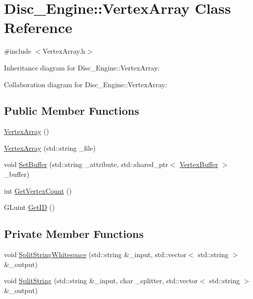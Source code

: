 \hypertarget{class_disc___engine_1_1_vertex_array}{}\section{Disc\+\_\+\+Engine\+:\+:Vertex\+Array Class Reference}
\label{class_disc___engine_1_1_vertex_array}


{\ttfamily \#include $<$Vertex\+Array.\+h$>$}



Inheritance diagram for Disc\+\_\+\+Engine\+:\+:Vertex\+Array\+:


Collaboration diagram for Disc\+\_\+\+Engine\+:\+:Vertex\+Array\+:
\subsection*{Public Member Functions}
\begin{DoxyCompactItemize}
\item 
\mbox{\hyperlink{class_disc___engine_1_1_vertex_array_ab8a2dcce9698f96dac5f9a19c6979d03}{Vertex\+Array}} ()
\item 
\mbox{\hyperlink{class_disc___engine_1_1_vertex_array_a5a2ba48c12787ad986bdf8dbb1a8675a}{Vertex\+Array}} (std\+::string \+\_\+file)
\item 
void \mbox{\hyperlink{class_disc___engine_1_1_vertex_array_a4e37246586ba4eca3a7734b050319a39}{Set\+Buffer}} (std\+::string \+\_\+attribute, std\+::shared\+\_\+ptr$<$ \mbox{\hyperlink{class_disc___engine_1_1_vertex_buffer}{Vertex\+Buffer}} $>$ \+\_\+buffer)
\item 
int \mbox{\hyperlink{class_disc___engine_1_1_vertex_array_a94f9ebffa24c5721783099fef186f9a0}{Get\+Vertex\+Count}} ()
\item 
G\+Luint \mbox{\hyperlink{class_disc___engine_1_1_vertex_array_ab5d3887c2b7ab5fa779cda481f776c98}{Get\+ID}} ()
\end{DoxyCompactItemize}
\subsection*{Private Member Functions}
\begin{DoxyCompactItemize}
\item 
void \mbox{\hyperlink{class_disc___engine_1_1_vertex_array_ada4ca194c3941ef272072f606b9f94a9}{Split\+String\+Whitespace}} (std\+::string \&\+\_\+input, std\+::vector$<$ std\+::string $>$ \&\+\_\+output)
\item 
void \mbox{\hyperlink{class_disc___engine_1_1_vertex_array_a70a7cd4a70803ed704ecf0c4f9f35e28}{Split\+String}} (std\+::string \&\+\_\+input, char \+\_\+splitter, std\+::vector$<$ std\+::string $>$ \&\+\_\+output)
\end{DoxyCompactItemize}
